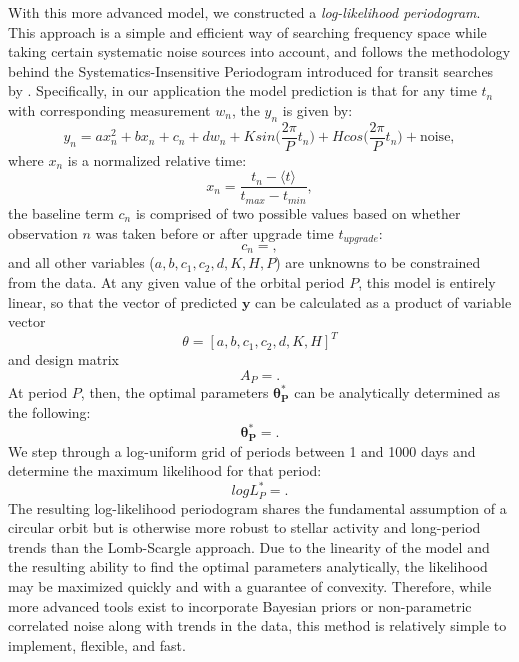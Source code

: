 \documentclass[modern]{aastex62}
\begin{document}
With this more advanced model, we constructed a \textit{log-likelihood periodogram}. 
This approach is a simple and efficient way of searching frequency space while taking certain systematic noise sources into account, and follows the methodology behind the Systematics-Insensitive Periodogram introduced for \kepler transit searches by \citet{Angus2016}. 
Specifically, in our application the model prediction is that for any time $t_n$ with corresponding \FWHM measurement $w_n$, the \RV $y_n$ is given by:
\begin{equation}
    y_n = a x_n^2 + b x_n + c_n + d w_n + K sin\Big(\frac{2\pi}{P} t_n\Big) + H cos\Big(\frac{2\pi}{P} t_n\Big) + \mathrm{noise},
\end{equation}
where $x_n$ is a normalized relative time:
\begin{equation}
    x_n = \frac{t_n - \langle t \rangle}{t_{max} - t_{min}},
\end{equation}
the baseline term $c_n$ is comprised of two possible values based on whether observation $n$ was taken before or after \HARPS upgrade time $t_{upgrade}$:
\begin{equation}
    c_n = ,
\end{equation}
and all other variables ($a, b, c_1, c_2, d, K, H, P$) are unknowns to be constrained from the data. 
At any given value of the orbital period $P$, this model is entirely linear, so that the vector of predicted \RVs $\mathbf{y}$ can be calculated as a product of variable vector
\begin{equation}
    \theta = [a, b, c_1, c_2, d, K, H]^T
\end{equation}
and design matrix
\begin{equation}
    A_P = .
\end{equation}
At period $P$, then, the optimal parameters $\mathbf{\theta^*_P}$ can be analytically determined as the following:
\begin{equation}
    \mathbf{\theta^*_P} = .
\end{equation}
We step through a log-uniform grid of periods between 1 and 1000 days and determine the maximum likelihood for that period:
\begin{equation}
    logL^*_P = .
\end{equation}
The resulting log-likelihood periodogram shares the fundamental assumption of a circular orbit but is otherwise more robust to stellar activity and long-period trends than the Lomb-Scargle approach. 
Due to the linearity of the model and the resulting ability to find the optimal parameters analytically, the likelihood may be maximized quickly and with a guarantee of convexity. 
Therefore, while more advanced tools exist to incorporate Bayesian priors \citep{Olspert2018} or non-parametric correlated noise \citep{Feng2017} along with trends in the data, this method is relatively simple to implement, flexible, and fast.
\end{document}
